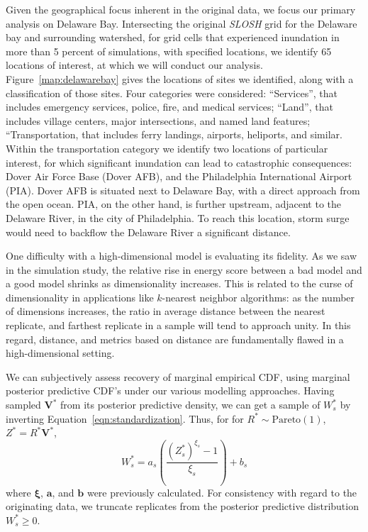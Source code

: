 Given the geographical focus inherent in the original data, we focus our primary analysis on Delaware Bay.
    Intersecting the original \emph{SLOSH} grid for the Delaware bay and surrounding watershed, 
    for grid cells that experienced inundation in more than 5 percent of simulations, 
    with specified locations, we identify 65 locations of interest, at which we will conduct 
    our analysis.  Figure~\ref{map:delawarebay} gives the locations of sites we identified, along
    with a classification of those sites.  Four categories were considered: ``Services'', that
    includes emergency services, police, fire, and medical services; ``Land'', that
    includes village centers, major intersections, and named land features; ``Transportation, 
    that includes ferry landings, airports, heliports, and similar.
    Within the transportation category we identify two
    locations of particular interest,  for which significant inundation can lead to 
    catastrophic consequences:   Dover Air Force Base (Dover AFB), and the Philadelphia International 
    Airport (PIA). Dover AFB is situated next to Delaware Bay, with a direct approach from the
    open ocean.  PIA, on the other hand, is further upstream, adjacent to the Delaware River, 
    in the city of Philadelphia.  To reach this location, storm surge would need to backflow 
    the Delaware River a significant distance.

One difficulty with a high-dimensional model is evaluating its fidelity.  As we saw in the simulation
    study, the relative rise in energy score between a bad model and a good model shrinks as
    dimensionality increases.  This is related to the curse of dimensionality in applications like
    $k$-nearest neighbor algorithms: as the number of dimensions increases, the ratio in average
    distance between the nearest replicate, and farthest replicate in a sample will tend to approach
    unity.  In this regard, distance, and metrics based on distance are fundamentally flawed in a 
    high-dimensional setting.

We can subjectively assess recovery of marginal empirical CDF, using marginal
    posterior predictive CDF's under our various modelling approaches.
    Having sampled $\bm{V}^{*}$ from its posterior predictive density, we can get a sample of $W_s^*$
    by inverting Equation~\eqref{eqn:standardization}.  Thus, for for $R^*\sim\text{Pareto}(1)$, 
    $Z^* = R^*\bm{V}^*$,
    \begin{equation*}
        W_s^* = a_s\left(\frac{(Z_s^*)^{\xi_s} - 1}{\xi_s}\right) + b_s
    \end{equation*}
    where $\bm{\xi}$, $\bm{a}$, and $\bm{b}$ were previously calculated.  
    For consistency with regard to the originating data, we truncate replicates 
    from the posterior predictive distribution $W_{s}^* \geq 0$.

